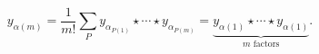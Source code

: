 \begin{equation}
y_{\alpha(m)}=\frac{1}{m!}\sum_{P} y_{\alpha_{P(1)}}\star \cdots \star
y_{\alpha_{P(m)}} = \underbrace{y_{\alpha(1)} \star \cdots
\star y_{\alpha(1)}}_{\mbox{$m$ factors}}.
\end{equation}

